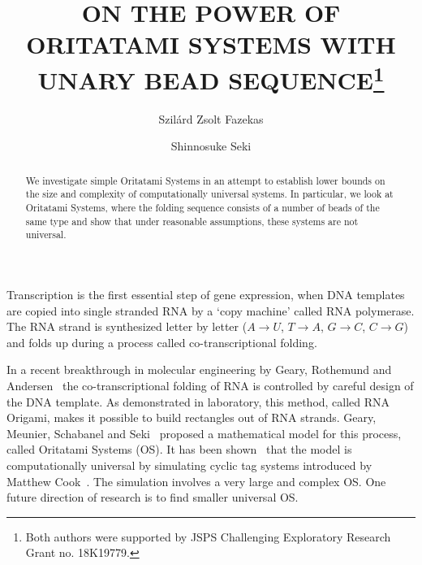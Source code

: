 \documentclass[]{llncs}
\begin{document}
\title{ON THE POWER OF ORITATAMI SYSTEMS WITH UNARY BEAD SEQUENCE\thanks{Both authors were supported by JSPS Challenging Exploratory Research Grant no. 18K19779.}}


\author{Szil\'ard Zsolt Fazekas \and
Shinnosuke Seki}
%
%
%
\maketitle


\begin{abstract}
We investigate simple Oritatami Systems in an attempt to establish lower bounds on the size and complexity of computationally universal systems. In particular, we look at Oritatami Systems, where the folding sequence consists of a number of beads of the same type and show that under reasonable assumptions, these systems are not universal.
\end{abstract}

Transcription is the first essential step of gene expression, when DNA templates are copied into single stranded RNA by a `copy machine' called RNA polymerase. The RNA strand is synthesized letter by letter ($A\rightarrow U$, $T\rightarrow A$, $G\rightarrow C$, $C\rightarrow G$) and folds up during a process called co-transcriptional folding.

In a recent breakthrough in molecular engineering by Geary, Rothemund and Andersen~\cite{RNAorigami} the co-transcriptional folding of RNA is controlled by careful design of the DNA template. As demonstrated in laboratory, this method, called RNA Origami, makes it possible to build rectangles out of RNA strands. Geary, Meunier, Schabanel and Seki~\cite{Oritatami} proposed a mathematical model for this process, called Oritatami Systems (OS).
It has been shown~\cite{Simulator} that the model is computationally universal by simulating cyclic tag systems introduced by Matthew Cook~\cite{Cook110}. The simulation involves a very large and complex OS. One future direction of research is to find smaller universal OS.
\end{document}
